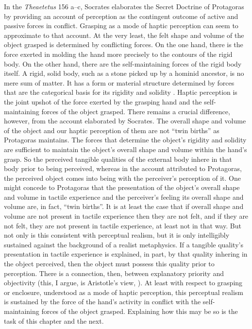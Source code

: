 In the \emph{Theaetetus} 156 a--c, Socrates elaborates the Secret Doctrine of Protagoras by providing an account of perception as the contingent outcome of active and passive forces in conflict. Grasping as a mode of haptic perception can seem to approximate to that account. At the very least, the felt shape and volume of the object grasped is determined by conflicting forces. On the one hand, there is the force exerted in molding the hand more precisely to the contours of the rigid body. On the other hand, there are the self-maintaining forces of the rigid body itself. A rigid, solid body, such as a stone picked up by a hominid ancestor, is no mere sum of matter. It has a form or material structure determined by forces that are the categorical basis for its rigidity and solidity \citep{Johnston:2006js}. Haptic perception is the joint upshot of the force exerted by the grasping hand and the self-maintaining forces of the object grasped. There remains a crucial difference, however, from the account elaborated by Socrates. The overall shape and volume of the object and our haptic perception of them are not ``twin births'' as Protagoras maintains. The forces that determine the object's rigidity and solidity are sufficient to maintain the object's overall shape and volume within the hand's grasp. So the perceived tangible qualities of the external body inhere in that body prior to being perceived, whereas in the account attributed to Protagoras, the perceived object comes into being with the perceiver's perception of it. One might concede to Protagoras that the presentation of the object's overall shape and volume in tactile experience and the perceiver's feeling its overall shape and volume are, in fact, ``twin births''. It is at least the case that if overall shape and volume are not present in tactile experience then they are not felt, and if they are not felt, they are not present in tactile experience, at least not in that way. But not only is this consistent with perceptual realism, but it is only intelligibly sustained against the background of a realist metaphysics. If a tangible quality's presentation in tactile experience is explained, in part, by that quality inhering in the object perceived, then the object must possess this quality prior to perception. There is a connection, then, between explanatory priority and objectivity (this, I argue, is Aristotle's view, \citealt{Kalderon:2015fr}). At least with respect to grasping or enclosure, understood as a mode of haptic perception, this perceptual realism is sustained by the force of the hand's activity in conflict with the self-maintaining forces of the object grasped. Explaining how this may be so is the task of this chapter and the next.

